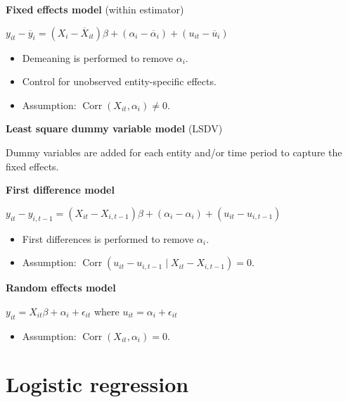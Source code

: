 \documentclass[10pt, a4paper, landscape]{article}
\DeclareMathOperator{\Corr}{Corr}
\begin{document}
\begin{multicols}{3}
\textbf{Fixed effects model} (within estimator)

\begin{center}
	\( y_{it} - \overline{y}_{i} = (X_{i} - \overline{X}_{it}) \beta + (\alpha_{i} - \overline{\alpha}_{i}) + (u_{it} - \overline{u}_{i}) \)
\end{center}

\begin{itemize}[leftmargin=*]
	\item Demeaning is performed to remove \( \alpha_{i} \).
	\item Control for unobserved entity-specific effects.
	\item Assumption: \( \Corr(X_{it}, \alpha_i) \neq 0 \).
\end{itemize}

\textbf{Least square dummy variable model} (LSDV)

Dummy variables are added for each entity and/or time period to capture the fixed effects.

\textbf{First difference model}

\begin{center}
	\( y_{it} - y_{i, t - 1} = (X_{it} - X_{i, t - 1}) \beta + (\alpha_{i} - \alpha_{i}) + (u_{it} - u_{i, t - 1}) \)
\end{center}

\begin{itemize}[leftmargin=*]
	\item First differences is performed to remove \( \alpha_{i} \).
	\item Assumption: \( \Corr(u_{it} - u_{i, t - 1} \mid X_{it} - X_{i, t - 1}) = 0 \).
\end{itemize}

\textbf{Random effects model}

\begin{center}
	\( y_{it} = X_{it} \beta + \alpha_{i} + \epsilon_{it} \) where \( u_{it} = \alpha_{i} + \epsilon_{it} \)
\end{center}

\begin{itemize}[leftmargin=*]
	\item Assumption: \( \Corr(X_{it}, \alpha_i) = 0 \).
\end{itemize}

\section*{Logistic regression}


\end{multicols}
\end{document}

